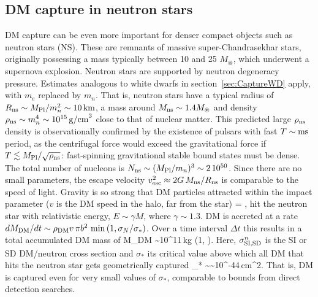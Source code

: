 \subsection{DM capture in neutron stars}\label{sec:CaptureNS}
DM capture can be even more important for  denser compact objects such as
neutron stars (NS). These are remnants of massive super-Chandrasekhar
stars, originally possessing a mass typically between 10 and 25 $M_\circledast$, which underwent a supernova explosion. 
Neutron stars are supported by neutron degeneracy pressure.
Estimates analogous to white dwarfs in section~\ref{sec:CaptureWD} apply, with $m_e$ replaced by $m_n$.
That is, neutron stars have a typical radius of $R_{\rm ns} \sim M_{\rm Pl}/m_n^2\sim 10 \,{\rm km}$, 
a mass around $M_{\rm ns} \sim 1.4  M_\circledast$
and density $\rho_{\rm ns} \sim m_n^4 \sim 10^{15}\,{\rm g/cm}^3$ close to that of nuclear matter.
This predicted large $\rho_{\rm ns}$ density is observationally confirmed by the existence of
pulsars with fast $T \sim{\rm ms}$ period,
as the centrifugal force would exceed the gravitational force if $T \lesssim M_{\rm Pl}/\sqrt{\rho_{\rm ns}}$:
fast-spinning gravitational stable bound states must be dense.
The total number of nucleons is $N_{\rm ns} \sim (M_{\rm Pl}/m_n)^3 \sim 2 \, 10^{50} $.
Since there are no small parameters,
the escape velocity $v_{\rm esc}^2 \approx 2 G \, M_{\rm ns} /R_{\rm ns} $ is comparable to the speed of light. 
Gravity is so strong that DM particles attracted within the impact parameter ($v$ is the DM speed in the halo, far from the star)
\beq\label{eq:bns}
=  {},
\eeq
 hit the neutron star with relativistic energy,  $E\sim \gamma M$, where $\gamma \sim 1.3 $.
DM is accreted at a rate
$ dM_{\rm DM}/dt \sim \rho_{\rm DM} v \, \pi b^2\, \min\left(1, \sigma_N/\sigma_*\right)$.
Over a time interval $\Delta t$ this results in a total accumulated DM mass of
\beq
M_{\rm DM} 
\sim 10^{11}\,{\rm kg}   
 \min\left(1, \right).
 \eeq
Here, $\sigma^n_{\rm SI,SD}$ is the SI or SD DM/neutron cross section and 
$\sigma_*$ its critical value above which
all DM that hits the neutron star gets geometrically captured
\beq
\sigma_* \sim {}\sim 10^{-44}\,{\rm cm}^2.
\eeq
That is, DM is captured even for very small values of $\sigma_* $, 
comparable to bounds from direct detection searches.


